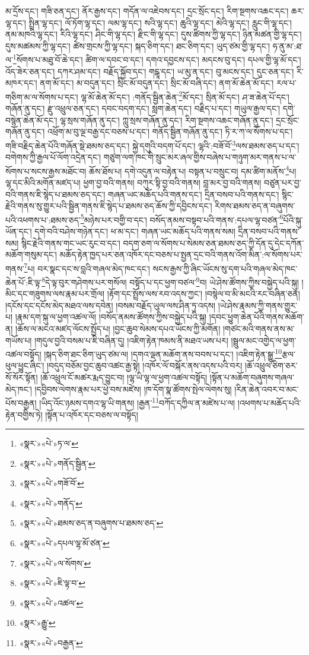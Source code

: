 མ་དྲོས་དང་། གཟི་ཅན་དང་། ནོར་རྒྱས་དང་། གདོན་ལ་འཇེབས་དང་། དྲང་སྲོང་དང་། རིག་སྔགས་འཆང་དང་། ཆར་ལྷ་དང་། སྤྲིན་ལྷ་དང་། ལོ་ཏོག་ལྷ་དང་། ལམ་ལྷ་དང་། སའི་ལྷ་དང་། ཆུའི་ལྷ་དང་། མེའི་ལྷ་དང་། རླུང་གི་ལྷ་དང་། ནམ་མཁའི་ལྷ་དང་། རིའི་ལྷ་དང་། ཤིང་གི་ལྷ་དང་། རྫིང་གི་ལྷ་དང་། དུས་ཚིགས་ཀྱི་ལྷ་དང་། ཉིན་མཚན་གྱི་ལྷ་དང་། དུས་མཚམས་ཀྱི་ལྷ་དང་། ཚེས་གྲངས་ཀྱི་ལྷ་དང་། སྐད་ཅིག་དང་། ཐང་ཅིག་དང་། ཡུད་ཙམ་གྱི་ལྷ་དང་། ཧ་ནུ་མ་:ཐ་ལ་\footnote{«སྣར་»«པེ་»ཏ་ལ་}སོགས་པ་མཐུ་བོ་ཆེ་དང་། ཚིག་ལ་དབང་བ་དང་། དགའ་དབྱངས་དང་། མདངས་བུ་དང་། དཔལ་གྱི་ལྷ་མོ་དང་། འོད་ཟེར་ཅན་དང་། དཀར་ཤམ་དང་། བརྗོད་སྐྱོབ་དང་། གངྒཱ་དང་། ཡ་མུ་ན་དང་། བུ་མངས་དང་། དུང་ཅན་དང་། རི་མཁར་དང་། ནག་མོ་དང་། མ་བདུན་དང་། སྲིང་མོ་བདུན་དང་། སྲིང་མོ་བཞི་དང་། ནག་མོ་ཆེན་མོ་དང་། རལ་པ་གཅིག་མ་ལ་སོགས་པ་དང་། ལྷ་མོ་ཆེན་མོ་དང་། :གནོད་སྦྱིན་ཆེན་\footnote{«སྣར་»«པེ་»གནོད་སྦྱིན་}མོ་དང་། སྲིན་མོ་དང་། ཤ་ཟ་ཆེན་པོ་དང་། གཞོན་ནུ་དང་། རྫུ་འཕྲུལ་ཅན་དང་། དབང་བདག་དང་། སླག་ཆེན་དང་། བརྗིད་པ་དང་། གཡུལ་རྒྱལ་དང་། དགེ་བསྙེན་ཆེན་མོ་དང་། ལྷ་སྲས་གཞོན་ནུ་དང་། ཀླུ་སྲས་གཞོན་ནུ་དང་། རིག་སྔགས་འཆང་གཞོན་ནུ་དང་། དྲང་སྲོང་གཞོན་ནུ་དང་། འཕྲོག་མ་བུ་ལྔ་བརྒྱ་དང་བཅས་པ་དང་། གནོད་སྦྱིན་གཞོན་ནུ་དང་། ཏི་ར་ཀ་ལ་སོགས་པ་དང་། གཟི་བརྗིད་ཆེན་པོའི་གཞོན་སྡེ་ཐམས་ཅད་དང་། སྐྱེ་དགུའི་བདག་པོ་དང་། ལྷའི་:བཟོ་བོ་\footnote{«སྣར་»«པེ་»གཟོ་བོ་}ལས་ཐམས་ཅད་པ་དང་། བགེགས་ཀྱི་རྒྱལ་པོ་ལོག་འདྲེན་དང་། གཙུག་ལག་ཁང་གི་སྲུང་མར་ཞལ་གྱིས་བཞེས་པ་གཉུག་མར་གནས་པ་ལ་སོགས་པ་སངས་རྒྱས་མཐོང་བ། ཆོས་ཐོས་པ། དགེ་འདུན་ལ་བརྟེན་པ། བསྟན་པ་བསྲུང་བ། དམ་ཚིག་མནོས་\footnote{«སྣར་»«པེ་»གནོད་}པ། ལྷ་དང་མིའི་མགོན་མཛད་པ། ཕྱག་བྱ་བའི་གནས། བཀུར་སྟི་བྱ་བའི་གནས། བླ་མར་བྱ་བའི་གནས། བཙུན་པར་བྱ་བའི་གནས་ཇི་སྙེད་པ་ཐམས་ཅད་དང་། གཞན་ཡང་མཆོད་པའི་གནས་དང་། དྲིན་བསབ་པའི་གནས་དང་། སྙིང་རྗེའི་གནས་སུ་གྱུར་པའི་སྦྱིན་གནས་ཇི་སྙེད་པ་ཐམས་ཅད་ཆོས་ཀྱི་དབྱིངས་དང་། རིགས་ཐམས་ཅད་ན་བཞུགས་པའི་འཕགས་པ་:ཐམས་ཅད་\footnote{«སྣར་»«པེ་»ཐམས་ཅད་ན་བཞུགས་པ་ཐམས་ཅད་}མཉེས་པར་བགྱི་བ་དང་། བསོད་ནམས་བསྟབ་པའི་གནས་:དཔལ་ལྷ་བཙན་\footnote{«སྣར་»«པེ་»དཔལ་ལྷ་མོ་ཙན་}པོའི་སྐུ་ཡོན་དང་། དགེ་བའི་བཤེས་གཉེན་དང་། ཕ་མ་དང་། གཞན་ཡང་མཆོད་པའི་གནས་སམ། དྲིན་བསབ་པའི་གནས་སམ། སྙིང་རྗེའི་གནས་གང་ཡང་རུང་བ་དང་། བདག་ཅག་ལ་སོགས་པ་སེམས་ཅན་ཐམས་ཅད་ཀྱི་དོན་དུ་དེང་དཀོན་མཆོག་གསུམ་དང་། མཆོད་རྟེན་ཁྱད་པར་ཅན་འཁོར་དང་བཅས་པ་སྤྱན་དྲང་བའི་གནས་འོག་མིན་:ལ་སོགས་པར་གནས་\footnote{«སྣར་»«པེ་»ལ་སོགས་}པ། བར་སྣང་དང་ས་བླའི་གཞལ་མེད་ཁང་དང་། སངས་རྒྱས་ཀྱི་ཞིང་ཡོངས་སུ་དག་པའི་གཞལ་མེད་ཁང་ཆེན་པོ་:ཇི་ལྟ་\footnote{«སྣར་»«པེ་»ཇི་ལྟ་བ་}དེ་ལྟ་བུར་གཤེགས་པར་གསོལ། བསྟོད་པ་དང་ཕྱག་བཙལ་\footnote{«སྣར་»«པེ་»འཚལ་}བ། ཡེ་ཤེས་ཚོགས་ཀྱིས་བསྐྱེད་པའི་སྐུ། །མིང་དང་གཟུགས་ལས་རྣམ་པར་གྲོལ། །རྟོག་དང་སྤྲོས་ལས་རབ་འདས་ཀྱང་། །བསྙེལ་བ་མི་མངའི་རང་བཞིན་ཅན། །དངོས་དང་དངོས་མེད་མཐའ་ལས་དབེན། །བསམ་བརྗོད་ཡུལ་ལས་ཤིན་ཏུ་འདས། །ཡེ་ཤེས་རྣམས་ཀྱི་གནས་གྱུར་པ། །རྣམ་དག་སྐུ་ལ་ཕྱག་འཚལ་ལོ། །བསོད་ནམས་ཚོགས་ཀྱིས་བསྐྱེད་པའི་སྐུ། །དབང་ཕྱུག་ཆེན་པོའི་གནས་མཆོག་ན། །ཆོས་ལ་མངའ་མཛད་ལོངས་སྤྱོད་པ། །བྱང་ཆུབ་སེམས་དཔའ་ཡོངས་ཀྱི་མགོན། །གཙང་མའི་གནས་ནས་མ་གཡོས་པ། །གདུལ་བྱའི་བསམ་པ་ཇི་བཞིན་དུ། །འཇིག་རྟེན་ཁམས་ནི་མཐའ་ཡས་པར། །སྦྲུལ་མང་འགྱེད་ལ་ཕྱག་འཚལ་བསྟོད། །སྐད་ཅིག་ཐང་ཅིག་ཡུད་ཙམ་ལ། །དགའ་ལྡན་མཆོག་ནས་བབས་པ་དང་། །འཇིག་རྟེན་སྒྱུ་\footnote{«སྣར་»རྒྱུ་}རྩལ་ཕུལ་ཕྱུང་ཞིང་། །བདུད་བཅོམ་བྱང་ཆུབ་འཚང་རྒྱ་སྟེ། །འཁོར་ལོ་བསྐོར་ནས་འདས་པའི་བར། །ཆོ་འཕྲུལ་ཅིག་ཅར་སོ་སོར་སྟོན། །ཆོ་འཕྲུལ་ངོ་མཚར་རྨད་བྱུང་བ། །ལྷ་ཡི་ལྷ་ལ་ཕྱག་འཚལ་བསྟོད། །སྟོན་པ་མཆོག་བཞུགས་གཞལ་མེད་ཁང་། །དབྱིབས་ལེགས་རྣམ་པར་ཕྱེ་བས་མཛེས། །ཁ་དོག་སྣ་ཚོགས་སྤེལ་ལེགས་སུ། །རིན་ཆེན་འབར་བ་མང་པོས་བརྒྱན། །ཡིད་འོང་ཉམས་དགའ་ལྷ་ཡི་གནས། །རྒྱན་\footnote{«སྣར་»«པེ་»བརྒྱན་}བཀོད་དཀྱིལ་ན་མཛེས་པ་ལ། །འཕགས་པ་མཆོད་པའི་རྟེན་བགྱིས་ཏེ། །སྟོན་པ་འཁོར་དང་བཅས་ལ་བསྟོད། 